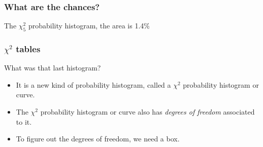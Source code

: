 \documentclass[handout]{beamer}
\begin{document}


   \begin{frame}
   \frametitle{What are the chances?}
   \begin{center}
   \end{center}
   The $\chi^2_5$ probability histogram, the area is 1.4\%
   \end{frame}


   \begin{frame} \frametitle{$\chi^2$ tables}

   \begin{block}
   {What was that last histogram?}
   \begin{itemize}
     \item It is a new kind of probability histogram, called a $\chi^2$ probability histogram or curve.
   \item The $\chi^2$ probability histogram or curve also has
    {\em degrees of freedom} associated to it.
   \item To figure out the degrees of freedom,
     we need a box.

   \end{itemize}
   \end{block}
   \end{frame}

\end{document}
